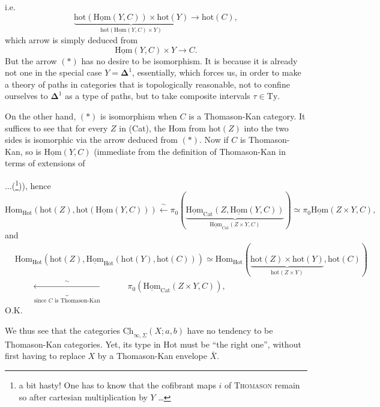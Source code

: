 \documentclass[11pt]{article}
\newcommand{\printedpage}[1]{\marginpar{\footnotesize p.~#1}}
\newcommand{\msp}[1]{\marginpar{\footnotesize [#1]}}
\newcommand{\uHom}{\underline{\mathrm{Hom}}}
\newcommand{\uCh}{\underline{\mathrm{Ch}}}
\newcommand{\hot}{\mathrm{hot}}
\begin{document}
\printedpage{84}

i.e.
\[
\underbrace{\hot(\uHom(Y,C))\times\hot(Y)}_{\hot(\uHom(Y,C)\times Y)}\longrightarrow\hot(C),
\]
which arrow is simply deduced from
\[
\uHom(Y,C)\times Y\longrightarrow C.
\]
But the arrow $(*)$ has no desire to be isomorphism. It is because it is already not one in the special case $Y=\mathbf{\Delta}^1$, essentially, which forces us, in order to make a theory of paths in categories that is topologically reasonable, not to confine ourselves to $\mathbf{\Delta}^1$ as a type of paths, but to take composite intervals $\tau\in\mathrm{Ty}$.

\msp{page 136}

On the other hand, $(*)$ is isomorphism when $C$ is a Thomason-Kan category. It suffices to see that for every $Z$ in (Cat), the Hom from $\hot(Z)$ into the two sides is isomorphic via the arrow deduced from $(*)$. Now if $C$ is Thomason-Kan, so is $\uHom(Y,C)$ (immediate from the definition of Thomason-Kan in terms of extensions of
$\ldots$(\footnote[29]{a bit hasty! One has to know that the cofibrant maps $i$ of \textsc{Thomason} remain so after cartesian multiplication by $Y$ \ldots})), hence
\[
\mathrm{Hom}_{\mathrm{Hot}}(\hot(Z),\hot(\uHom(Y,C)))\xleftarrow{\ \sim\ }\pi_0(\underbrace{\uHom_{\mathrm{Cat}}(Z,\uHom(Y,C))}_{\uHom_{\mathrm{Cat}}(Z\times Y,C)})\simeq\pi_0\uHom(Z\times Y,C), %
\]
and
\[
\begin{aligned}
&\mathrm{Hom}_{\mathrm{Hot}}(\hot(Z),\uHom_{\mathrm{Hot}}(\hot(Y),\hot(C)))\simeq\mathrm{Hom}_{\mathrm{Hot}}(\underbrace{\hot(Z)\times\hot(Y)}_{\hot(Z\times Y)},\hot(C))\\
&\qquad\underbrace{\xleftarrow{\ \sim\ }}_{\text{since $C$ is Thomason-Kan}}\qquad\quad\pi_0(\uHom_{\mathrm{Cat}}(Z\times Y,C)),
\end{aligned}
\]
O.K.

We thus see that the categories $\uCh_{\infty,\Sigma}(X;a,b)$ have no tendency to be Thomason-Kan categories. Yet, its type in Hot must be ``the right one'', without first having to replace $X$ by a Thomason-Kan envelope $\bar{X}$.

\printedpage{85}

\msp{page 137}
\end{document}
